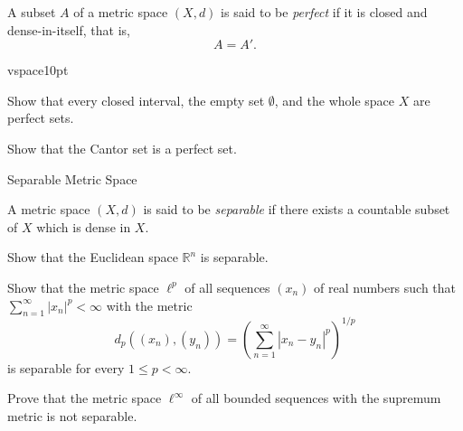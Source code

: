 \documentclass[12pt, a4paper]{article}
\begin{document}
\begin{definition}
A subset $A$ of a metric space $(X,d)$ is said to be \emph{perfect} if it is closed and
dense-in-itself, that is,
\[
A=A'.
\]
\end{definition}

vspace{10pt}

\begin{problem}
Show that every closed interval, the empty set $\emptyset$, and the whole space $X$ are
perfect sets.
\end{problem}

\clearpage

\begin{problem}
Show that the Cantor set is a perfect set.
\end{problem}

\clearpage

\begin{heading}
    Separable Metric Space
\end{heading}

\begin{definition}
A metric space $(X,d)$ is said to be \emph{separable} if there exists a countable subset of $X$
which is dense in $X$.
\end{definition}

\clearpage

\begin{problem}
Show that the Euclidean space $\mathbb{R}^n$ is separable.
\end{problem}

\clearpage

\begin{problem}
Show that the metric space $\ell^p$ of all sequences $(x_n)$ of real numbers such that $\sum_{n=1}^\infty |x_n|^p<\infty$ with the metric
\[d_p((x_n),(y_n))=\left(\sum_{n=1}^\infty |x_n-y_n|^p\right)^{1/p}\]
is separable for every $1\leq p<\infty$.
\end{problem}

\clearpage

\begin{problem}
Prove that the metric space $\ell^\infty$ of all bounded sequences with the supremum metric
is not separable.
\end{problem}


\clearpage

\EndPage
\end{document}
